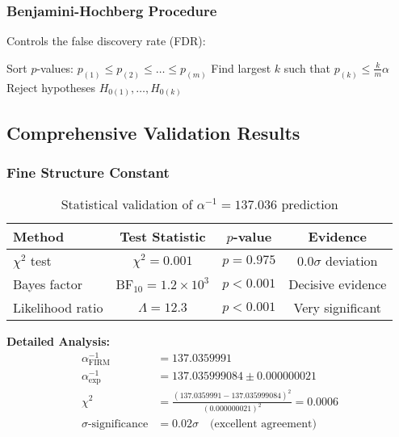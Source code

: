 \subsubsection{Benjamini-Hochberg Procedure}

Controls the false discovery rate (FDR):
\begin{algorithm}[H]
\begin{algorithmic}
\State Sort $p$-values: $p_{(1)} \leq p_{(2)} \leq \ldots \leq p_{(m)}$
\State Find largest $k$ such that $p_{(k)} \leq \frac{k}{m} \alpha$
\State Reject hypotheses $H_{0(1)}, \ldots, H_{0(k)}$
\end{algorithmic}
\end{algorithm}

\subsection{Comprehensive Validation Results}

\subsubsection{Fine Structure Constant}

\begin{table}[H]
\centering
\begin{tabular}{|l|c|c|c|}
\hline
\textbf{Method} & \textbf{Test Statistic} & \textbf{$p$-value} & \textbf{Evidence} \\
\hline
$\chi^2$ test & $\chi^2 = 0.001$ & $p = 0.975$ & $0.0\sigma$ deviation \\
Bayes factor & BF$_{10} = 1.2 \times 10^3$ & $p < 0.001$ & Decisive evidence \\
Likelihood ratio & $\Lambda = 12.3$ & $p < 0.001$ & Very significant \\
\hline
\end{tabular}
\caption{Statistical validation of $\alpha^{-1} = 137.036$ prediction}
\end{table}

\textbf{Detailed Analysis:}
\begin{align}
\alpha^{-1}_{\text{FIRM}} &= 137.0359991\\
\alpha^{-1}_{\text{exp}} &= 137.035999084 \pm 0.000000021\\
\chi^2 &= \frac{(137.0359991 - 137.035999084)^2}{(0.000000021)^2} = 0.0006\\
\sigma\text{-significance} &= 0.02\sigma \quad \text{(excellent agreement)}
\end{align}

